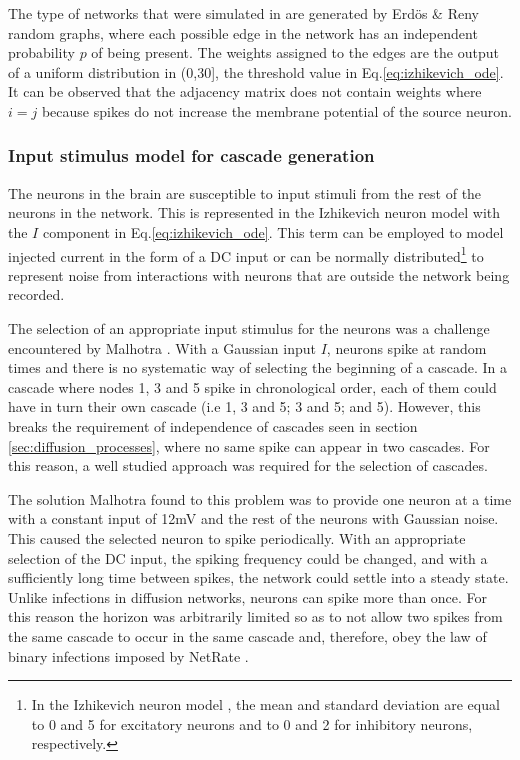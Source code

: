 \documentclass[11pt]{article}
\begin{document}
The type of networks that were simulated in \cite{alexandru2018estimating} are generated by Erdös \& Reny random graphs, where each possible edge in the network has an independent probability $p$ of being present. The weights assigned to the edges are the output of a uniform distribution in (0,30], the threshold value in Eq.\ref{eq:izhikevich_ode}. It can be observed that the adjacency matrix does not contain weights where $i=j$ because spikes do not increase the membrane potential of the source neuron.


\subsubsection{Input stimulus model for cascade generation}\label{sec:input_stimulus_model_for_cascade_generation}

The neurons in the brain are susceptible to input stimuli from the rest of the neurons in the network. This is represented in the Izhikevich neuron model with the $I$ component in Eq.\ref{eq:izhikevich_ode}. This term can be employed to model injected current in the form of a DC input or can be normally distributed\footnote{In the Izhikevich neuron model \cite{izhikevich2003simple}, the mean and standard deviation are equal to 0 and 5 for excitatory neurons and to 0 and 2 for inhibitory neurons, respectively.} to represent noise from interactions with neurons that are outside the network being recorded.

The selection of an appropriate input stimulus for the neurons was a challenge encountered by Malhotra \cite{alexandru2018estimating}. With a Gaussian input $I$, neurons spike at random times and there is no systematic way of selecting the beginning of a cascade. In a cascade where nodes 1, 3 and 5 spike in chronological order, each of them could have in turn their own cascade (i.e 1, 3 and 5; 3 and 5; and 5). However, this breaks the requirement of independence of cascades seen in section \ref{sec:diffusion_processes}, where no same spike can appear in two cascades. For this reason, a well studied approach was required for the selection of cascades. 

The solution Malhotra found to this problem was to provide one neuron at a time with a constant input of 12mV and the rest of the neurons with Gaussian noise. This caused the selected neuron to spike periodically. With an appropriate selection of the DC input, the spiking frequency could be changed, and with a sufficiently long time between spikes, the network could settle into a steady state. Unlike infections in diffusion networks, neurons can spike more than once. For this reason the horizon was arbitrarily limited so as to not allow two spikes from the same cascade to occur in the same cascade and, therefore, obey the law of binary infections imposed by NetRate \cite{alexandru2018estimating}.
\end{document}
